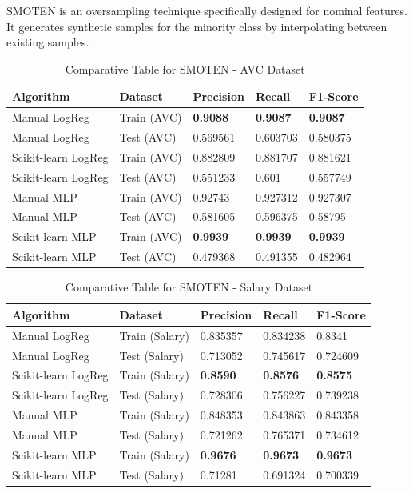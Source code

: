 \documentclass[a4paper,12pt]{article}
\begin{document}
SMOTEN is an oversampling technique specifically designed for nominal features. It generates synthetic samples for the minority class by interpolating between existing samples.

\begin{table}[h!]
    \centering
    \caption{Comparative Table for SMOTEN - AVC Dataset}
    \begin{tabularx}{\textwidth}{|l|l|X|X|X|}
    \hline
    \textbf{Algorithm} & \textbf{Dataset} & \textbf{Precision} & \textbf{Recall} & \textbf{F1-Score} \\
    \hline
    Manual LogReg & Train (AVC) & \textbf{0.9088} & \textbf{0.9087} & \textbf{0.9087} \\
    Manual LogReg & Test (AVC) & 0.569561 & 0.603703 & 0.580375 \\
    Scikit-learn LogReg & Train (AVC) & 0.882809 & 0.881707 & 0.881621 \\
    Scikit-learn LogReg & Test (AVC) & 0.551233 & 0.601 & 0.557749 \\
    Manual MLP & Train (AVC) & 0.92743 & 0.927312 & 0.927307 \\
    Manual MLP & Test (AVC) & 0.581605 & 0.596375 & 0.58795 \\
    Scikit-learn MLP & Train (AVC) & \textbf{0.9939} & \textbf{0.9939} & \textbf{0.9939} \\
    Scikit-learn MLP & Test (AVC) & 0.479368 & 0.491355 & 0.482964 \\
    \hline
    \end{tabularx}
\end{table}

\begin{table}[h!]
    \centering
    \caption{Comparative Table for SMOTEN - Salary Dataset}
    \begin{tabularx}{\textwidth}{|l|l|X|X|X|}
    \hline
    \textbf{Algorithm} & \textbf{Dataset} & \textbf{Precision} & \textbf{Recall} & \textbf{F1-Score} \\
    \hline
    Manual LogReg & Train (Salary) & 0.835357 & 0.834238 & 0.8341 \\
    Manual LogReg & Test (Salary) & 0.713052 & 0.745617 & 0.724609 \\
    Scikit-learn LogReg & Train (Salary) & \textbf{0.8590} & \textbf{0.8576} & \textbf{0.8575} \\
    Scikit-learn LogReg & Test (Salary) & 0.728306 & 0.756227 & 0.739238 \\
    Manual MLP & Train (Salary) & 0.848353 & 0.843863 & 0.843358 \\
    Manual MLP & Test (Salary) & 0.721262 & 0.765371 & 0.734612 \\
    Scikit-learn MLP & Train (Salary) & \textbf{0.9676} & \textbf{0.9673} & \textbf{0.9673} \\
    Scikit-learn MLP & Test (Salary) & 0.71281 & 0.691324 & 0.700339 \\
    \hline
    \end{tabularx}
\end{table}
\end{document}
